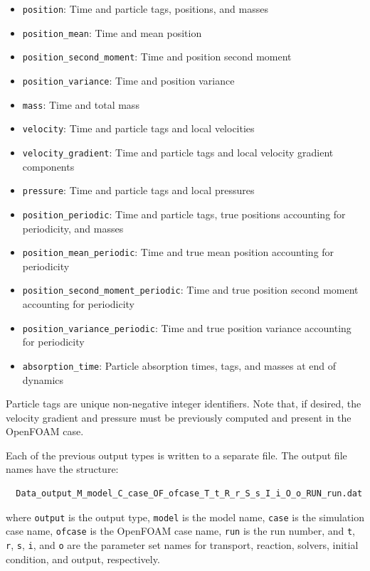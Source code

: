 \documentclass[11pt]{article}
\begin{document}
\begin{itemize}
\item \lstinline{position}: Time and particle tags, positions, and masses
\item \lstinline{position_mean}: Time and mean position
\item \lstinline{position_second_moment}: Time and position second moment
\item \lstinline{position_variance}: Time and position variance
\item \lstinline{mass}: Time and total mass
\item \lstinline{velocity}: Time and particle tags and local velocities
\item \lstinline{velocity_gradient}: Time and particle tags and local velocity gradient components
\item \lstinline{pressure}: Time and particle tags and local pressures
\item \lstinline{position_periodic}: Time and particle tags, true positions accounting for periodicity, and masses
\item \lstinline{position_mean_periodic}: Time and true mean position accounting for periodicity
\item \lstinline{position_second_moment_periodic}: Time and true position second moment accounting for periodicity
\item \lstinline{position_variance_periodic}: Time and true position variance accounting for periodicity
\item \lstinline{absorption_time}: Particle absorption times, tags, and masses at end of dynamics
\end{itemize}
Particle tags are unique non-negative integer identifiers. Note that, if desired, the velocity gradient and pressure must be previously computed and present in the OpenFOAM case.

Each of the previous output types is written to a separate file. The output file names have the structure:
%
\begin{lstlisting}
  Data_output_M_model_C_case_OF_ofcase_T_t_R_r_S_s_I_i_O_o_RUN_run.dat
\end{lstlisting}
where \lstinline{output} is the output type, \lstinline{model} is the model name, \lstinline{case} is the simulation case name, \lstinline{ofcase} is the OpenFOAM case name, \lstinline{run} is the run number, and \lstinline{t}, \lstinline{r}, \lstinline{s}, \lstinline{i}, and \lstinline{o} are the parameter set names for transport, reaction, solvers, initial condition, and output, respectively.

%
%
\end{document}
